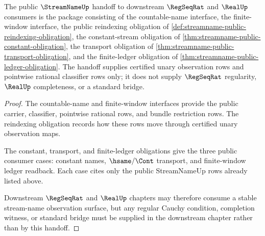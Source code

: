 \begin{theorem}
\label{thm:streamname-public-real-handoff-obligation}
The public $\StreamNameUp$ handoff to downstream $\RegSeqRat$ and $\RealUp$
consumers is the package consisting of the countable-name interface, the
finite-window interface, the public reindexing obligation of
\autoref{def:streamname-public-reindexing-obligation}, the constant-stream
obligation of \autoref{thm:streamname-public-constant-obligation}, the
transport obligation of \autoref{thm:streamname-public-transport-obligation},
and the finite-ledger obligation of
\autoref{thm:streamname-public-ledger-obligation}. The handoff supplies
certified unary observation rows and pointwise rational classifier rows only;
it does not supply $\RegSeqRat$ regularity, $\RealUp$ completeness, or a
standard bridge.
\end{theorem}
\begin{proof}
The countable-name and finite-window interfaces provide the public carrier,
classifier, pointwise rational rows, and bundle restriction rows. The
reindexing obligation records how these rows move through certified unary
observation maps.

The constant, transport, and finite-ledger obligations give the three public
consumer cases: constant names, $\hsame/\Cont$ transport, and finite-window
ledger readback. Each case cites only the public StreamNameUp rows already
listed above.

Downstream $\RegSeqRat$ and $\RealUp$ chapters may therefore consume a stable
stream-name observation surface, but any regular Cauchy condition, completion
witness, or standard bridge must be supplied in the downstream chapter rather
than by this handoff.
\end{proof}

